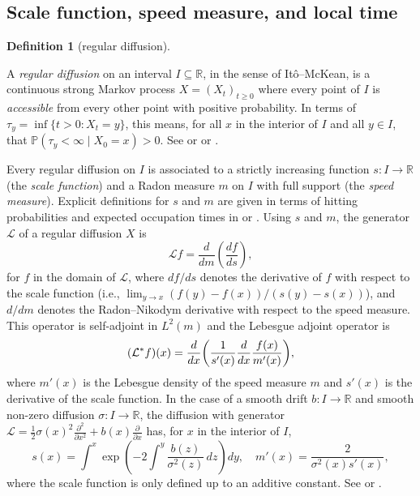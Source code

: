 \documentclass[aap,preprint]{imsart}
\DeclarePairedDelimiter{\ppair}{(}{)} %
\newcommand\pp[2][0pt]{\ppair*{#2}} %
\numberwithin{equation}{section}
\theoremstyle{plain}
\theoremstyle{definition}
\newtheorem{definition}[theorem]{Definition}
\begin{document}
\subsection{Scale function, speed measure, and local time}\label{review-regular-diffusion-processes}



\begin{definition}[regular
diffusion]\label{def-regular-diffusion}

A \emph{regular diffusion} on an interval \(I \subseteq \mathbb{R}\),
in the sense of Itô--McKean, is a continuous strong Markov process
\(X = (X_t)_{t \geq 0}\) where every point of \(I\) is \emph{accessible} from every other point with positive probability. In terms of  $\tau_y=\inf\{t>0\colon X_t=y\}$, this means, for all \(x\) in the interior of $I$ and all \(y  \in I\), that
  \(
  \mathbb{P}(\tau_y<\infty \mid X_0=x) > 0
  \). See \citep[Definition~45.2]{RogersWilliams2000} or \cite[Chapter~15.1]{karlintaylor1981} or \cite[Chapter VII, before Proposition~3.1]{RevuzYor1999}.
\end{definition}
%
Every regular diffusion on \(I\) is associated to a strictly increasing function \(s\colon I \to \mathbb{R}\) (the \emph{scale
  function}) and a Radon measure \(m\) on \(I\) with full support (the
  \emph{speed measure}). Explicit definitions for $s$ and $m$ are given in terms of hitting probabilities and expected occupation times in \cite[Section~4.1]{ItoMcKean1965} or \cite[Proposition~3.2 and Theorem~3.6]{RevuzYor1999}. Using $s$ and $m$, the generator \(\mathcal{L}\) of a regular diffusion \(X\) is
\begin{equation}\label{eq:generator-scale-speed}
  \mathcal{L}f = \frac{d}{dm}\!\left(\frac{df}{ds}\right),
\end{equation}
for \(f\) in the domain of \(\mathcal{L}\), where $df/ds$ denotes the derivative of $f$ with respect to the scale function (i.e., $\lim_{y\to x}(f(y)-f(x))/(s(y)-s(x))$), and $d/dm$ denotes the Radon--Nikodym derivative with respect to the speed measure.   This operator is self-adjoint in $L^2(m)$ and the Lebesgue adjoint operator is \begin{equation}
  \label{eq-adjoint-generator}
    (\mathcal{L}^*f)(x) = \frac{d}{dx}\pp{\frac{1}{s'(x)}\frac{d}{dx}\frac{f(x)}{m'(x)}},
  \end{equation}
  where $m'(x)$ is the Lebesgue density of the speed measure $m$ and $s'(x)$ is the derivative of the scale function.     In the case of a smooth drift $b\colon I\to \mathbb R$ and smooth non-zero diffusion $\sigma\colon I\to \mathbb R$, the diffusion with generator $\mathcal L=\frac 12 \sigma(x)^2\frac{\partial^2}{\partial x^2}+b(x)\frac{\partial}{\partial x}$ has, for $x$ in the interior of $I$,  \begin{equation}
    \label{eq-scale-speed-sde}
    s(x) = \int^x \exp\left(-2\int^y \frac{b(z)}{\sigma^2(z)}\,dz\right) dy,  \quad m'(x)=\frac{2}{\sigma^2(x)s'(x)},
  \end{equation}
  where the scale function is only defined up to an additive constant. See
 \cite[Chapter~VII, Theorem~3.12 and Exercise~3.20]{RevuzYor1999} or \cite[Section~4.2]{ItoMcKean1965}.
\end{document}
